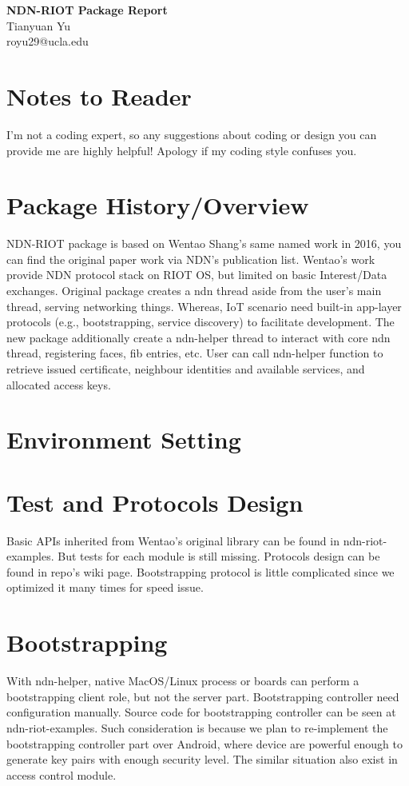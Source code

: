 \documentclass[a4paper, 11pt]{article}
\begin{document}
    \noindent
    \large\textbf{NDN-RIOT Package Report} \\
    \normalsize Tianyuan Yu \\ royu29@ucla.edu
    
    \section*{Notes to Reader}
    I'm not a coding expert, so any suggestions about coding or design you can provide me are highly helpful! Apology if my coding style confuses you.
    
    \section*{Package History/Overview}
    NDN-RIOT package is based on Wentao Shang's same named work in 2016, you can find the original paper work via NDN's publication list. Wentao's work provide NDN protocol stack on RIOT OS, but limited on basic Interest/Data exchanges. Original package creates a ndn thread aside from the user's main thread, serving networking things. Whereas, IoT scenario need built-in app-layer protocols (e.g., bootstrapping, service discovery) to facilitate development. The new package additionally create a ndn-helper thread to interact with core ndn thread, registering faces, fib entries, etc. User can call ndn-helper function to retrieve issued certificate, neighbour identities and available services, and allocated access keys.
    
    \section*{Environment Setting}

     
    \section*{Test and Protocols Design}
    Basic APIs inherited from Wentao's original library can be found in ndn-riot-examples. But tests for each module is still missing. Protocols design can be found in repo's wiki page. Bootstrapping protocol is little complicated since we optimized it many times for speed issue.      
     
    \section*{Bootstrapping}
    With ndn-helper, native MacOS/Linux process or boards can perform a bootstrapping client role, but not the server part. Bootstrapping controller need configuration manually. Source code for bootstrapping controller can be seen at ndn-riot-examples. Such consideration is because we plan to re-implement the bootstrapping controller part over Android, where device are powerful enough to generate key pairs with enough security level. The similar situation also exist in access control module.
    
\end{document}
